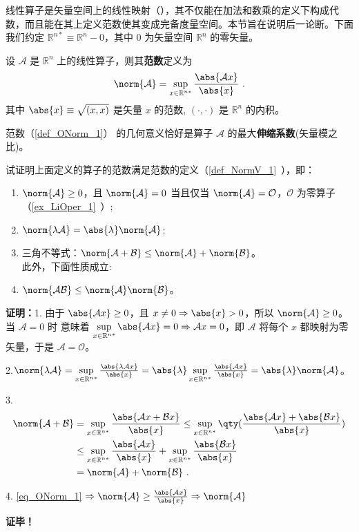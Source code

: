 线性算子是矢量空间上的线性映射（），其不仅能在加法和数乘的定义下构成代数，而且能在其上定义范数使其变成完备度量空间。本节旨在说明后一论断。下面我们约定 $\mathbb R^{n*}\equiv\mathbb R^n-0$，其中 $0$ 为矢量空间 $\mathbb R^n$ 的零矢量。
\begin{definition}{}\label{def_ONorm_1}
设 $\mathcal A$ 是 $\mathbb R^n$ 上的线性算子，则其\textbf{范数}定义为
\begin{equation}\label{eq_ONorm_1}
\norm{\mathcal A}=\sup_{x\in{\mathbb R^{n*}}}\frac{\abs{\mathcal Ax}}{\abs{x}}~.
\end{equation}
其中 $\abs{x}\equiv\sqrt{(x,x)}$ 是矢量 $x$ 的范数, $(\cdot,\cdot)$ 是 $\mathbb R^n$ 的内积。
\end{definition}
范数（\autoref{def_ONorm_1}） 的几何意义恰好是算子 $\mathcal A$ 的最大\textbf{伸缩系数}(矢量模之比)。
\begin{example}{}
试证明上面定义的算子的范数满足范数的定义（\autoref{def_NormV_1}~），即：
\begin{enumerate}
\item $\norm{\mathcal A}\geq0$，且 $\norm{\mathcal A}=0$ 当且仅当 $\norm{\mathcal A}=\mathcal O$，$\mathcal O$ 为零算子（\autoref{ex_LiOper_1}~）;
\item $\norm{\lambda \mathcal A}=\abs{\lambda}\norm{\mathcal A}$;
\item 三角不等式：$\norm{\mathcal A+\mathcal B}\leq\norm{\mathcal A}+\norm{\mathcal B}$。\\
此外，下面性质成立:\\
\item $\norm{\mathcal{AB}}\leq{\norm{\mathcal A}}\norm{\mathcal B}$。
\end{enumerate}
\end{example}
\textbf{证明：}1. 由于 $\abs{\mathcal A x}\geq0$，且 $x\neq0\Rightarrow\abs{x}>0$，所以
$\norm{\mathcal A}\geq0$。当 $\mathcal A=0$ 时 意味着 $\sup\limits_{x\in{\mathbb R^{n*}}}\abs{\mathcal A x}=0\Rightarrow\mathcal A x=0$，即 $\mathcal A$ 将每个 $x$ 都映射为零矢量，于是 $\mathcal A=\mathcal O$。

2.$\norm{\lambda\mathcal A}=\sup\limits_{x\in{\mathbb R^{n*}}}\frac{\abs{\lambda \mathcal Ax}}{\abs{x}}=\abs{\lambda}\sup\limits_{x\in{\mathbb R^{n*}}}\frac{\abs{\mathcal Ax}}{\abs{x}}=\abs{\lambda}\norm{\mathcal A}
$。

3.\begin{equation}
\begin{aligned}
\norm{\mathcal A+\mathcal B}&=\sup\limits_{x\in{\mathbb R^{n*}}}\frac{\abs{\mathcal Ax+\mathcal B x}}{\abs{x}}\leq\sup\limits_{x\in{\mathbb R^{n*}}}\qty(\frac{\abs{\mathcal Ax}+\abs{\mathcal B x}}{\abs{x}})\\
&\leq \sup\limits_{x\in{\mathbb R^{n*}}}\frac{\abs{ \mathcal Ax}}{\abs{x}}+\sup\limits_{x\in{\mathbb R^{n*}}}\frac{\abs{\mathcal B x}}{\abs{x}}\\
&=\norm{\mathcal A}+\norm{\mathcal B}~.
\end{aligned}
\end{equation}

4. \autoref{eq_ONorm_1} $\Rightarrow\norm{\mathcal A}\geq\frac{\abs{\mathcal Ax}}{\abs{x}}\Rightarrow \norm{\mathcal A}$

\textbf{证毕！}
